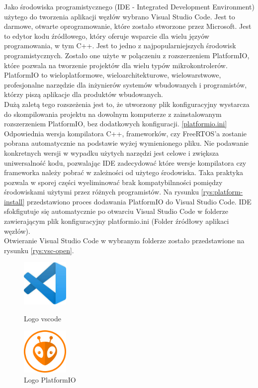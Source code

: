 \documentclass[12pt,oneside,a4paper]{book}
\theoremstyle{break}
\begin{document}
Jako środowiska programistycznego (IDE - Integrated Development Environment) 
użytego do tworzenia aplikacji węzłów wybrano 
Visual Studio Code\cite{vscode}. Jest to darmowe, otwarte oprogramowanie, które zostało
stworzone przez Microsoft. Jest to edytor kodu źródłowego, który oferuje wsparcie dla wielu
języów programowania, w tym C++. Jest to jedno z najpopularniejszych środowisk programistycznych.
Zostało one użyte w polączeniu z rozszerzeniem PlatformIO\cite{platformio}, które pozwala na
tworzenie projektów dla wielu typów mikrokontrolerów.\\
PlatformIO to wieloplatformowe, wieloarchitekturowe, wielowarstwowe,
profesjonalne narzędzie dla inżynierów systemów wbudowanych i programistów,
którzy piszą aplikacje dla produktów wbudowanych. \cite{what-platformio}\\
Dużą zaletą tego rozszeżenia jest to,
że utworzony plik konfiguracyjny wystarcza do skompilowania projektu na dowolnym komputerze
z zainstalowanym rozszerzeniem PlatformIO, bez dodatkowych konfiguracji. \ref{platformio.ini}\\
Odpowiednia wersja kompilatora C++, frameworków, czy FreeRTOS'a zostanie pobrana
automatycznie na podstawie wyżej wymienionego pliku. Nie podawanie konkretnych wersji w wypadku użytych narzędzi
jest celowe i zwiększa uniwersalność kodu, pozwalając IDE zadecydować które wersje kompilatora czy frameworka
należy pobrać w zależności od użytego środowiska. Taka praktyka pozwala w sporej części wyeliminować
brak kompatybilnności pomiędzy środowiskami użytymi przez różnych programistów.
Na rysunku \ref{rys:platform-install} przedstawiono proces dodawania PlatformIO do Visual Studio Code.
IDE sfokfigutuje się automatycznie po otwarciu Visual Studio Code w folderze zawierającym plik konfiguracyjny
platformio.ini (Folder źródłowy aplikaci węzłów).\\
Otwieranie Visual Studio Code w wybranym folderze zostało przedstawione na rysunku \ref{rys:vsc-open}.



\begin{figure}[H]
    \begin{center}
        \includegraphics[width=0.20\textwidth]{vscode.jpeg}    
        \caption{Logo vscode}
        \includegraphics[width=0.20\textwidth]{platformio.png}    
        \caption{Logo PlatformIO}
    \end{center}
\end{figure}
\end{document}
